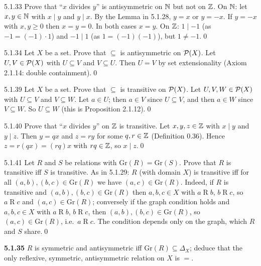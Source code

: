 \begin{bookex}[recommended]{5.1.33}
Prove that ``$x$ divides $y$'' is antisymmetric on $\mathbb{N}$ but not on $\mathbb{Z}$.
\solution
On $\mathbb{N}$: let $x,y\in\mathbb{N}$ with $x\mid y$ and $y\mid x$. By the Lemma in 5.1.28, $y=x$ or $y=-x$. If $y=-x$ with $x,y\ge0$ then $x=y=0$. In both cases $x=y$. On $\mathbb{Z}$: $1\mid-1$ (as $-1=(-1)\cdot1$) and $-1\mid1$ (as $1=(-1)(-1)$), but $1\ne-1$.\qed
\end{bookex}

\begin{bookex}[recommended]{5.1.34}
Let $X$ be a set. Prove that $\subseteq$ is antisymmetric on $\mathcal{P}(X)$.
\solution
Let $U,V\in\mathcal{P}(X)$ with $U\subseteq V$ and $V\subseteq U$. Then $U=V$ by set extensionality (Axiom 2.1.14: double containment).\qed
\end{bookex}

\begin{bookex}[essential]{5.1.39}
Let $X$ be a set. Prove that $\subseteq$ is transitive on $\mathcal{P}(X)$.
\solution
Let $U,V,W\in\mathcal{P}(X)$ with $U\subseteq V$ and $V\subseteq W$. Let $a\in U$; then $a\in V$ since $U\subseteq V$, and then $a\in W$ since $V\subseteq W$. So $U\subseteq W$ (this is Proposition 2.1.12).\qed
\end{bookex}

\begin{bookex}[essential]{5.1.40}
Prove that ``$x$ divides $y$'' on $\mathbb{Z}$ is transitive.
\solution
Let $x,y,z\in\mathbb{Z}$ with $x\mid y$ and $y\mid z$. Then $y=qx$ and $z=ry$ for some $q,r\in\mathbb{Z}$ (Definition 0.36). Hence $z=r(qx)=(rq)x$ with $rq\in\mathbb{Z}$, so $x\mid z$.\qed
\end{bookex}

\begin{bookex}[essential]{5.1.41}
Let $R$ and $S$ be relations with $\mathrm{Gr}(R)=\mathrm{Gr}(S)$. Prove that $R$ is transitive iff $S$ is transitive.
\solution
As in 5.1.29: $R$ (with domain $X$) is transitive iff for all $(a,b),(b,c)\in\mathrm{Gr}(R)$ we have $(a,c)\in\mathrm{Gr}(R)$. Indeed, if $R$ is transitive and $(a,b),(b,c)\in\mathrm{Gr}(R)$ then $a,b,c\in X$ with $a\mathrel Rb$, $b\mathrel Rc$, so $a\mathrel Rc$ and $(a,c)\in\mathrm{Gr}(R)$; conversely if the graph condition holds and $a,b,c\in X$ with $a\mathrel Rb$, $b\mathrel Rc$, then $(a,b),(b,c)\in\mathrm{Gr}(R)$, so $(a,c)\in\mathrm{Gr}(R)$, i.e.\ $a\mathrel Rc$. The condition depends only on the graph, which $R$ and $S$ share.\qed
\end{bookex}

\begin{trybox}[{5.1.35 \fO}]
\textbf{5.1.35} $R$ is symmetric and antisymmetric iff $\mathrm{Gr}(R)\subseteq\Delta_X$; deduce that the only reflexive, symmetric, antisymmetric relation on $X$ is $=$.
\end{trybox}

